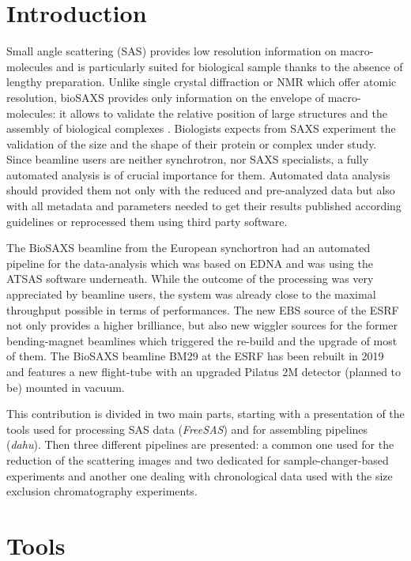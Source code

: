 \documentclass[preprint]{iucr}              %
\begin{document}
\section{Introduction}
Small angle scattering (SAS) provides low resolution information on macro-molecules and is  
particularly suited for biological sample thanks to the absence of lengthy preparation.
Unlike single crystal diffraction or NMR which offer atomic resolution, bioSAXS provides only information on the envelope of macro-molecules: it allows to validate the relative position of large structures and the assembly of biological complexes \cite{biosaxs_rev2018}. 
Biologists expects from SAXS experiment the validation of the size and the shape of their protein or complex under study. 
Since beamline users are neither synchrotron, nor SAXS specialists, a fully automated analysis is of crucial importance for them. 
Automated data analysis should provided them not only with the reduced and pre-analyzed data but also with all metadata and parameters needed to get their results published according guidelines \cite{guidelines_2017} or  reprocessed them using third party software. 

The BioSAXS beamline from the European synchortron \cite{BM29paper} had an automated pipeline for the data-analysis which was based on EDNA \cite{edna} and was using the ATSAS \cite{ATSAS2} software underneath. 
While the outcome of the processing was very appreciated by beamline users, the system was already close to the maximal throughput possible in terms of performances. 
The new EBS source \cite{EBS} of the ESRF not only provides a higher brilliance, but also new wiggler sources for the former bending-magnet beamlines which triggered the re-build and the upgrade of most of them. 
The BioSAXS beamline BM29 at the ESRF has been rebuilt in 2019 and features a new flight-tube with an upgraded  Pilatus 2M detector (planned to be) mounted in vacuum. 

This contribution is divided in two main parts, starting with a presentation of the tools used for 
processing SAS data (\textit{FreeSAS}) and for assembling pipelines (\textit{dahu}).
Then three different pipelines are presented: a common one used for the reduction of the scattering images and two dedicated for sample-changer-based experiments and another one dealing with chronological data used with the size exclusion chromatography experiments.      

\section{Tools}
\end{document}
